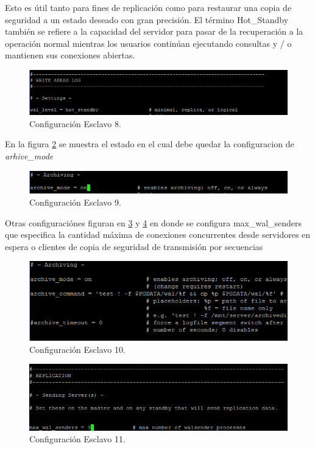 Esto es útil tanto para fines de replicación como para restaurar una copia de seguridad a un estado deseado con gran precisión. El término Hot\_Standby también se refiere a la capacidad del servidor para pasar de la recuperación a la operación normal mientras los usuarios continúan ejecutando consultas y / o mantienen sus conexiones abiertas.

\begin{figure}[H]
\centering
\includegraphics[width=\columnwidth]{eRelatedWorks/src/Captura8}
\caption{Configuración Esclavo 8. }\label{figC:8}
\end{figure}

En la figura \ref{figC:9} se muestra el estado en el cual debe quedar la configuracion de \textit{arhive\_mode} 

\begin{figure}[H]
\centering
\includegraphics[width=\columnwidth]{eRelatedWorks/src/Captura9}
\caption{Configuración Esclavo 9. }\label{figC:9}
\end{figure}

Otras configuraciónes figuran en \ref{figC:10} y \ref{figC:11} en donde se configura max\_wal\_senders que especifica la cantidad máxima de conexiones concurrentes desde servidores en espera o clientes de copia de seguridad de transmisión por secuencias

\begin{figure}[H]
\centering
\includegraphics[width=\columnwidth]{eRelatedWorks/src/Captura10}
\caption{Configuración Esclavo 10. }\label{figC:10}
\end{figure}


\begin{figure}[H]
\centering
\includegraphics[width=\columnwidth]{eRelatedWorks/src/Captura11}
\caption{Configuración Esclavo 11. }\label{figC:11}
\end{figure}

